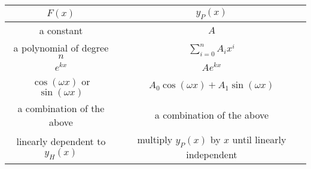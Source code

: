 \documentclass{article}
\begin{document}
\begin{table}[H]
    \centering
    \begin{tabular}{c c}
        \toprule
        \(F\left( x \right)\)                                                  & \(y_P\left( x \right)\)                                                   \\
        \midrule
        a constant                                                             & \(A\)                                                                     \\
        a polynomial of degree \(n\)                                           & \(\sum_{i = 0}^n A_i x^i\)                                                \\
        \(e^{kx}\)                                                             & \(A e^{kx}\)                                                              \\
        \(\cos{\left( \omega x \right)}\) or \(\sin{\left( \omega x \right)}\) & \(A_0 \cos{\left( \omega x \right)} + A_1 \sin{\left( \omega x \right)}\) \\
        a combination of the above                                             & a combination of the above                                                \\
        linearly dependent to \(y_H\left( x \right)\)                          & multiply \(y_P\left( x \right)\) by \(x\) until linearly independent      \\
        \bottomrule
    \end{tabular}
\end{table}
\end{document}
